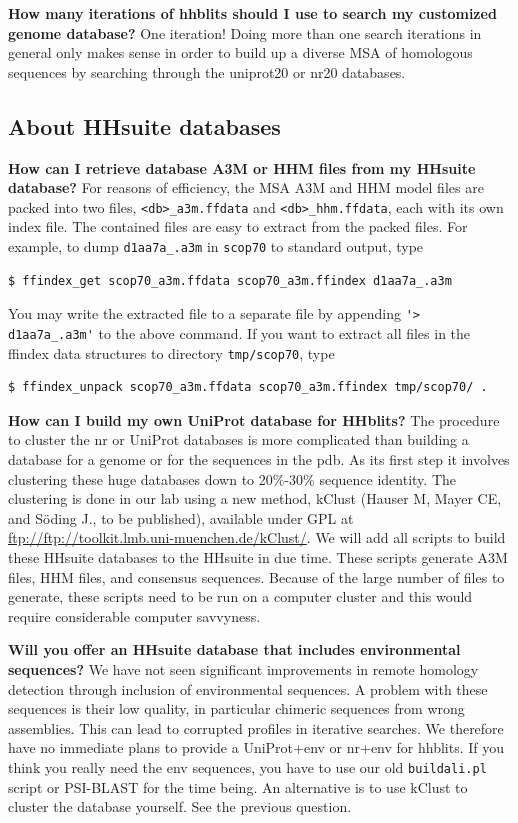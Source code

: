 \documentclass[11pt,a4paper]{article}
\begin{document}
{\bf How many iterations of hhblits should I use to search my customized genome database?} One iteration! Doing more than one search iterations in general only makes sense in order to build up a diverse MSA of homologous sequences by searching through the uniprot20 or nr20 databases. 



\subsection{About HHsuite databases}


{\bf How can I retrieve database A3M or HHM files from my HHsuite database?}
For reasons of efficiency, the MSA A3M and HHM model files are packed into two files, \verb`<db>_a3m.ffdata` and \verb`<db>_hhm.ffdata`, each with its own index file. The contained files are easy to extract from the packed files. For example, to dump \verb`d1aa7a_.a3m` in \verb`scop70` to standard output, type 
\begin{verbatim}
$ ffindex_get scop70_a3m.ffdata scop70_a3m.ffindex d1aa7a_.a3m
\end{verbatim}
You may write the extracted file to a separate file by appending \verb`'> d1aa7a_.a3m'` to the above command.
If you want to extract all files in the ffindex data structures to directory \verb`tmp/scop70`, type
\begin{verbatim}
$ ffindex_unpack scop70_a3m.ffdata scop70_a3m.ffindex tmp/scop70/ .
\end{verbatim}

{\bf How can I build my own UniProt database for HHblits?}
The procedure to cluster the nr or UniProt databases is more complicated than building a database for a genome or for the sequences in the pdb. As its first step it involves clustering these huge databases down to 20\%-30\% sequence identity. The clustering is done in our lab using a new method, kClust (Hauser M, Mayer CE, and S\"oding J., to be published), available under GPL at \url{ftp://ftp://toolkit.lmb.uni-muenchen.de/kClust/}. We will add all scripts to build these HHsuite databases to the HHsuite in due time. These scripts generate A3M files, HHM files, and consensus sequences. Because of the large number of files to generate, these scripts need to be run on a computer cluster and this would require considerable computer savvyness. 

{\bf Will you offer an HHsuite database that includes environmental sequences?}
We have not seen significant improvements in remote homology detection through inclusion of environmental sequences. A problem with these sequences is their low quality, in particular chimeric sequences from wrong assemblies. This can lead to corrupted profiles in iterative searches. We therefore have no immediate plans to provide a UniProt+env or nr+env for hhblits. If you think you really need the env sequences, you have to use our old \verb`buildali.pl` script or PSI-BLAST for the time being. An alternative is to use kClust to cluster the database yourself. See the previous question.
\end{document}
